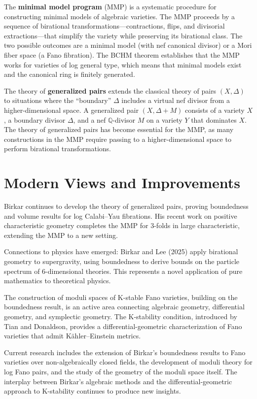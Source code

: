 The \textbf{minimal model program} (MMP) is a systematic procedure for constructing minimal models of algebraic varieties. The MMP proceeds by a sequence of birational transformations---contractions, flips, and divisorial extractions---that simplify the variety while preserving its birational class. The two possible outcomes are a minimal model (with nef canonical divisor) or a Mori fiber space (a Fano fibration). The BCHM theorem establishes that the MMP works for varieties of log general type, which means that minimal models exist and the canonical ring is finitely generated.

The theory of \textbf{generalized pairs} extends the classical theory of pairs $(X, \Delta)$ to situations where the ``boundary'' $\Delta$ includes a virtual nef divisor from a higher-dimensional space. A generalized pair $(X, \Delta + M)$ consists of a variety $X$, a boundary divisor $\Delta$, and a nef $\mathbb{Q}$-divisor $M$ on a variety $Y$ that dominates $X$. The theory of generalized pairs has become essential for the MMP, as many constructions in the MMP require passing to a higher-dimensional space to perform birational transformations.

\section{Modern Views and Improvements}

Birkar continues to develop the theory of generalized pairs, proving boundedness and volume results for log Calabi--Yau fibrations. His recent work on positive characteristic geometry completes the MMP for 3-folds in large characteristic, extending the MMP to a new setting.

Connections to physics have emerged: Birkar and Lee (2025) apply birational geometry to supergravity, using boundedness to derive bounds on the particle spectrum of 6-dimensional theories. This represents a novel application of pure mathematics to theoretical physics.

The construction of moduli spaces of K-stable Fano varieties, building on the boundedness result, is an active area connecting algebraic geometry, differential geometry, and symplectic geometry. The K-stability condition, introduced by Tian and Donaldson, provides a differential-geometric characterization of Fano varieties that admit K\"ahler--Einstein metrics.

Current research includes the extension of Birkar's boundedness results to Fano varieties over non-algebraically closed fields, the development of moduli theory for log Fano pairs, and the study of the geometry of the moduli space itself. The interplay between Birkar's algebraic methods and the differential-geometric approach to K-stability continues to produce new insights.

